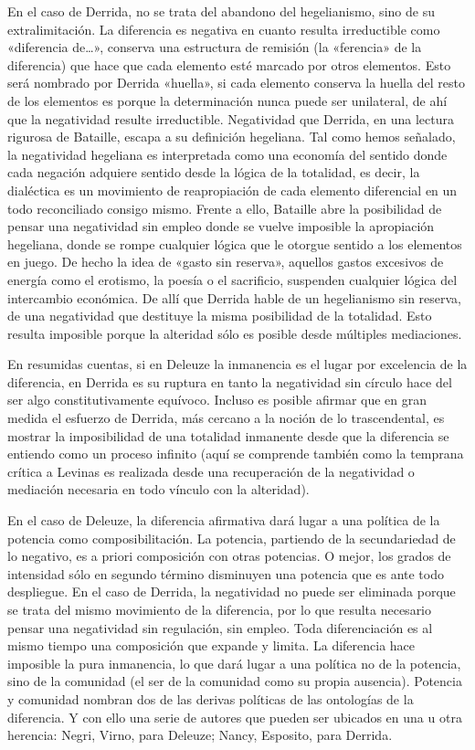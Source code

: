 En el caso de Derrida, no se trata del abandono del hegelianismo, sino de su extralimitación. La diferencia es negativa en cuanto resulta irreductible como «diferencia de\ldots», conserva una estructura de remisión (la «ferencia» de la diferencia) que hace que cada elemento esté marcado por otros elementos. Esto será nombrado por Derrida «huella», si cada elemento conserva la huella del resto de los elementos es porque la determinación nunca puede ser unilateral, de ahí que la negatividad resulte irreductible. Negatividad que Derrida, en una lectura rigurosa de Bataille, escapa a su definición hegeliana. Tal como hemos señalado, la negatividad hegeliana es interpretada como una economía del sentido donde cada negación adquiere sentido desde la lógica de la totalidad, es decir, la dialéctica es un movimiento de reapropiación de cada elemento diferencial en un todo reconciliado consigo mismo. Frente a ello, Bataille abre la posibilidad de pensar una negatividad sin empleo donde se vuelve imposible la apropiación hegeliana, donde se rompe cualquier lógica que le otorgue sentido a los elementos en juego. De hecho la idea de «gasto sin reserva», aquellos gastos excesivos de energía como el erotismo, la poesía o el sacrificio, suspenden cualquier lógica del intercambio económica. De allí que Derrida hable de un hegelianismo sin reserva, de una negatividad que destituye la misma posibilidad de la totalidad. Esto resulta imposible porque la alteridad sólo es posible desde múltiples mediaciones.

En resumidas cuentas, si en Deleuze la inmanencia es el lugar por excelencia de la diferencia, en Derrida es su ruptura en tanto la negatividad sin círculo hace del ser algo constitutivamente equívoco. Incluso es posible afirmar que en gran medida el esfuerzo de Derrida, más cercano a la noción de lo trascendental, es mostrar la imposibilidad de una totalidad inmanente desde que la diferencia se entiendo como un proceso infinito (aquí se comprende también como la temprana crítica a Levinas es realizada desde una recuperación de la negatividad o mediación necesaria en todo vínculo con la alteridad).

En el caso de Deleuze, la diferencia afirmativa dará lugar a una política de la potencia como composibilitación. La potencia, partiendo de la secundariedad de lo negativo, es a priori composición con otras potencias. O mejor, los grados de intensidad sólo en segundo término disminuyen una potencia que es ante todo despliegue. En el caso de Derrida, la negatividad no puede ser eliminada porque se trata del mismo movimiento de la diferencia, por lo que resulta necesario pensar una negatividad sin regulación, sin empleo. Toda diferenciación es al mismo tiempo una composición que expande y limita. La diferencia hace imposible la pura inmanencia, lo que dará lugar a una política no de la potencia, sino de la comunidad (el ser de la comunidad como su propia ausencia). Potencia y comunidad nombran dos de las derivas políticas de las ontologías de la diferencia. Y con ello una serie de autores que pueden ser ubicados en una u otra herencia: Negri, Virno, para Deleuze; Nancy, Esposito, para Derrida.

